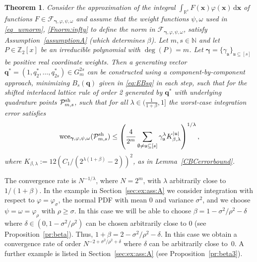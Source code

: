 \documentclass[namedate,webpdf,imanum]{ima-authoring-arxiv}%
\theoremstyle{thmstyletwo}%
\newtheorem{theorem}{Theorem}%
\numberwithin{equation}{section}
\newcommand{\bsx}{\boldsymbol{x}}
\newcommand{\bsq}{\boldsymbol{q}}
\newcommand{\bsgamma}{\boldsymbol{\gamma}}
\newcommand{\uu}{\mathfrak{u}}
\newcommand{\cP}{\mathcal{P}}
\begin{document}
\begin{theorem}\label{thm:error_bound}
Consider the approximation of the integral $\int_{\mathbb{R}^s} F(\bsx) \varphi(\bsx) \,\mathrm{d} \bsx$ of functions $F \in \mathcal{F}_{\bsgamma,\varphi,\psi,\omega}$ and assume that the weight functions $\psi,\omega$ used in \eqref{eq_uvnorm}, \eqref{Fnorm:infty} to define the norm in $\mathcal{F}_{\bsgamma,\varphi,\psi,\omega}$, satisfy Assumption~\ref{assumptionA} (which determines $\beta$). Let $m, s \in \mathbb{N}$ and let $P \in \mathbb{Z}_2[x]$ be an irreducible polynomial with $\deg(P) = m $. Let $\bsgamma=\{\gamma_{\uu}\}_{\uu \subseteq [s]}$ be positive real coordinate weights. Then a generating vector $\bsq^* = (1, q_2^*, \ldots, q_{2s}^*) \in G_m^{2s}$ can be constructed using a component-by-component approach, minimizing $ B_s(\bsq)$ given in \eqref{eq:EBsq} in each step, such that for the shifted interlaced lattice rule of order 2 generated by $\bsq^*$ with underlying quadrature points $\cP_{m,s}^{{\rm sh}}$, such that for all $ \lambda \in ( \frac{1}{1+\beta}, 1]$ the worst-case integration error satisfies
\begin{equation*}
{\rm wce}_{\bsgamma,\varphi,\psi,\omega}(\cP_{m,s}^{{\rm sh}})\le  \left( \frac{4}{2^m} \sum_{\emptyset \not= \uu \subseteq [s]} \gamma_{\uu}^\lambda K_{\beta,\lambda}^{|\uu|} \right)^{1/\lambda},
\end{equation*}
where $K_{\beta,\lambda}:=12 (C_1 / (2^{\lambda (1+\beta)} - 2))^2$, as in Lemma~\ref{CBCerrorbound}.
\end{theorem}

The convergence rate is $N^{-1/\lambda}$, where $N=2^m$, with $\lambda$ arbitrarily close to $1/(1+\beta)$. In the example in Section~\ref{sec:ex:ass:A} we consider integration with respect to $\varphi=\varphi_{\sigma}$, the normal PDF with mean 0 and variance $\sigma^2$, and we choose $\psi=\omega=\varphi_\rho$ with $\rho\ge \sigma$. In this case we will be able to choose $\beta=1-\sigma^2/\rho^2-\delta$ where $\delta \in (0,1-\sigma^2/\rho^2)$ can be chosen arbitrarily close to 0 (see Proposition~\ref{pr:beta}). Thus, $1+\beta=2-\sigma^2/\rho^2-\delta$. In this case we obtain a convergence rate of order $N^{-2+\sigma^2/\rho^2+\delta}$ where $\delta$ can be arbitrarily close to~0. A further example is listed in Section~\ref{sec:ex:ass:A} (see Proposition~\ref{pr:beta3}).
\end{document}
